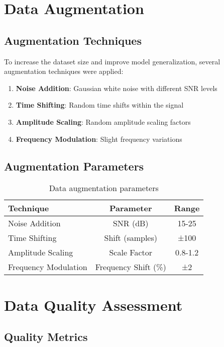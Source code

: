 \section{Data Augmentation}

\subsection{Augmentation Techniques}

To increase the dataset size and improve model generalization, several augmentation techniques were applied:

\begin{enumerate}
    \item \textbf{Noise Addition}: Gaussian white noise with different SNR levels
    \item \textbf{Time Shifting}: Random time shifts within the signal
    \item \textbf{Amplitude Scaling}: Random amplitude scaling factors
    \item \textbf{Frequency Modulation}: Slight frequency variations
\end{enumerate}

\subsection{Augmentation Parameters}

\begin{table}[H]
\centering
\caption{Data augmentation parameters}
\label{tab:augmentation_params}
\begin{tabular}{@{}lcc@{}}
\toprule
Technique & Parameter & Range \\
\midrule
Noise Addition & SNR (dB) & 15-25 \\
Time Shifting & Shift (samples) & ±100 \\
Amplitude Scaling & Scale Factor & 0.8-1.2 \\
Frequency Modulation & Frequency Shift (\%) & ±2 \\
\bottomrule
\end{tabular}
\end{table}

\section{Data Quality Assessment}

\subsection{Quality Metrics}

